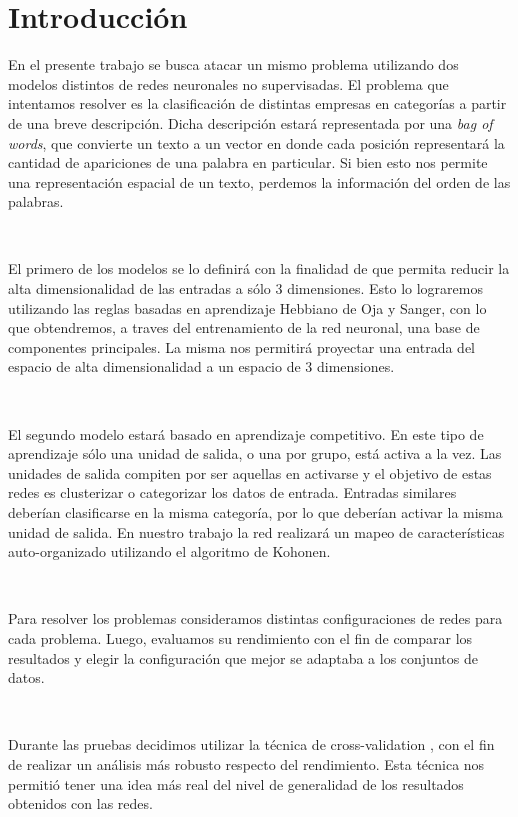\documentclass[informe.tex]{subfiles}
\begin{document}
  
  \section{Introducción}
  
  En el presente trabajo se busca atacar un mismo problema utilizando dos modelos distintos de redes neuronales no supervisadas. El problema que intentamos resolver es la clasificación de distintas empresas en categorías a partir de una breve descripción. Dicha descripción estará representada por una {\it bag of words}, que convierte un texto a un vector en donde cada posición representará la cantidad de apariciones de una palabra en particular. Si bien esto nos permite una representación espacial de un texto, perdemos la información del orden de las palabras.
  
  ~

  El primero de los modelos se lo definirá con la finalidad de que permita reducir la alta dimensionalidad de las entradas a sólo 3 dimensiones. Esto lo lograremos utilizando las reglas basadas en aprendizaje Hebbiano de Oja y Sanger\cite{haykin}, con lo que obtendremos, a traves del entrenamiento de la red neuronal, una base de componentes principales. La misma nos permitirá proyectar una entrada del espacio de alta dimensionalidad a un espacio de 3 dimensiones.
  
  ~
  
  El segundo modelo estará basado en aprendizaje competitivo\cite{haykin}. En este tipo de aprendizaje sólo una unidad de salida, o una por grupo, está activa a la vez. Las unidades de salida compiten por ser aquellas en activarse y el objetivo de estas redes es clusterizar o categorizar los datos de entrada. Entradas similares deberían clasificarse en la misma categoría, por lo que deberían activar la misma unidad de salida. En nuestro trabajo la red realizará un mapeo de características auto-organizado utilizando el algoritmo de Kohonen.
  
  ~
  
  Para resolver los problemas consideramos distintas configuraciones de redes para cada problema. Luego, evaluamos su rendimiento con el fin de comparar los resultados y elegir la configuración que mejor se adaptaba a los conjuntos de datos.
  
  ~
  
  Durante las pruebas decidimos utilizar la técnica de cross-validation \cite{haykin}, con el fin de realizar un análisis más robusto respecto del rendimiento. Esta técnica nos permitió tener una idea más real del nivel de generalidad de los resultados obtenidos con las redes.
  
  
\end{document}
